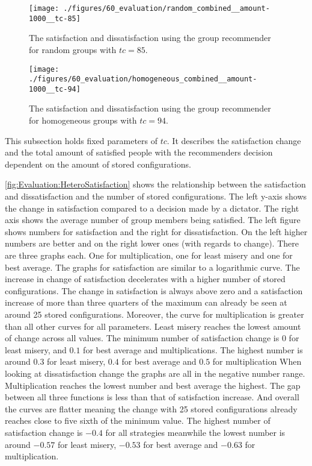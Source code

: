 \begin{figure}[p]
    \centering
    \texttt{[image: ./figures/60\_evaluation/random\_combined\_\_amount-1000\_\_tc-85]}
    \caption{The satisfaction and dissatisfaction using the group recommender for random groups with $tc = 85$.}
    \label{fig:Evaluation:RandomSatisfaction}
\end{figure}

\begin{figure}[p]
    \centering
    \texttt{[image: ./figures/60\_evaluation/homogeneous\_combined\_\_amount-1000\_\_tc-94]}
    \caption{The satisfaction and dissatisfaction using the group recommender for homogeneous groups with $tc = 94$.}
    \label{fig:Evaluation:HomoSatisfaction}
\end{figure}

This subsection holds fixed parameters of $tc$. It describes the satisfaction change and the total amount of satisfied people with the recommenders decision dependent on the amount of stored configurations.

\autoref{fig:Evaluation:HeteroSatisfaction} shows the relationship between the satisfaction and dissatisfaction and the number of stored configurations. The left y-axis shows the change in satisfaction compared to a decision made by a dictator. The right axis shows the average number of group members being satisfied. The left figure shows numbers for satisfaction and the right for dissatisfaction. On the left higher numbers are better and on the right lower ones (with regards to change). There are three graphs each. One for multiplication, one for least misery and one for best average. The graphs for satisfaction are similar to a logarithmic curve. The increase in change of satisfaction decelerates with a higher number of stored configurations. The change in satisfaction is always above zero and a satisfaction increase of more than three quarters of the maximum can already be seen at around 25 stored configurations. Moreover, the curve for multiplication is greater than all other curves for all parameters. Least misery reaches the lowest amount of change across all values. The minimum number of satisfaction change is $0$ for least misery, and $0.1$ for best average and multiplications. The highest number is around $0.3$ for least misery, $0.4$ for best average and $0.5$ for multiplication
When looking at dissatisfaction change the graphs are all in the negative number range. Multiplication reaches the lowest number and best average the highest. The gap between all three functions is less than that of satisfaction increase. And overall the curves are flatter meaning the change with 25 stored configurations already reaches close to five sixth of the minimum value. The highest number of satisfaction change is $-0.4$ for all strategies meanwhile the lowest number is around $-0.57$ for least misery, $-0.53$ for best average and $-0.63$ for multiplication.

